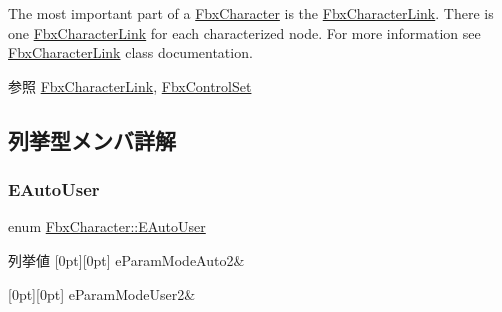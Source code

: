 The most important part of a \hyperlink{class_fbx_character}{Fbx\+Character} is the \hyperlink{class_fbx_character_link}{Fbx\+Character\+Link}. There is one \hyperlink{class_fbx_character_link}{Fbx\+Character\+Link} for each characterized node. For more information see \hyperlink{class_fbx_character_link}{Fbx\+Character\+Link} class documentation.

\begin{DoxySeeAlso}{参照}
\hyperlink{class_fbx_character_link}{Fbx\+Character\+Link}, \hyperlink{class_fbx_control_set}{Fbx\+Control\+Set} 
\end{DoxySeeAlso}


\subsection{列挙型メンバ詳解}
\mbox{\label{class_fbx_character_a5b03462709a82a15d89ee4563a4c49df}} 
\subsubsection{\texorpdfstring{E\+Auto\+User}{EAutoUser}}
{\footnotesize\ttfamily enum \hyperlink{class_fbx_character_a5b03462709a82a15d89ee4563a4c49df}{Fbx\+Character\+::\+E\+Auto\+User}}

\begin{DoxyEnumFields}{列挙値}
[0pt][0pt]{}\mbox{\label{class_fbx_character_a5b03462709a82a15d89ee4563a4c49dfaf79e904c4e50228fe6957393e7b11ad0}} 
e\+Param\+Mode\+Auto2&\\
\hline

[0pt][0pt]{}\mbox{\label{class_fbx_character_a5b03462709a82a15d89ee4563a4c49dfafbee83ba327243c6f52fbb08264b9fb4}} 
e\+Param\+Mode\+User2&\\
\hline

\end{DoxyEnumFields}
\mbox{\label{class_fbx_character_a44b6e7961224e21a78dbf91295e480fc}} 
